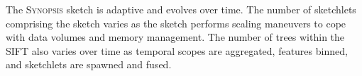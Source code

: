 The \textsc{Synopsis} sketch is adaptive and evolves over time. The number of sketchlets comprising the sketch varies as the sketch performs scaling maneuvers to cope with data volumes and memory management. The number of trees within the SIFT  also varies over time as temporal scopes are aggregated, features binned, and sketchlets are spawned and fused.
